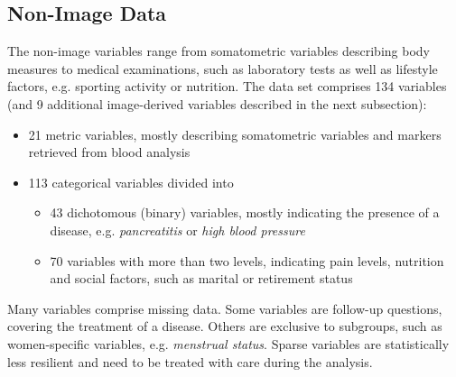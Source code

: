 \documentclass[a4paper,twoside]{style/article}
\begin{document}
\subsection{Non-Image Data}
The non-image variables range from somatometric variables describing body measures to medical examinations, such as laboratory tests as well as lifestyle factors, e.g. sporting activity or nutrition.
The data set comprises 134 variables (and 9 additional image-derived variables described in the next subsection):
\begin{itemize}
	\item 21 metric variables, mostly describing somatometric variables and markers retrieved from blood analysis
	\item 113 categorical variables divided into
	\begin{itemize}
		\item 43 dichotomous (binary) variables, mostly indicating the presence of a disease, e.g. \emph{pancreatitis} or \emph{high blood pressure}
		\item 70 variables with more than two levels, indicating pain levels, nutrition and social factors, such as marital or retirement status
	\end{itemize}
\end{itemize}
Many variables comprise missing data.
Some variables are follow-up questions, covering the treatment of a disease.
Others are exclusive to subgroups, such as women-specific variables, e.g. \emph{menstrual status}.
Sparse variables are statistically less resilient and need to be treated with care during the analysis.
\end{document}
